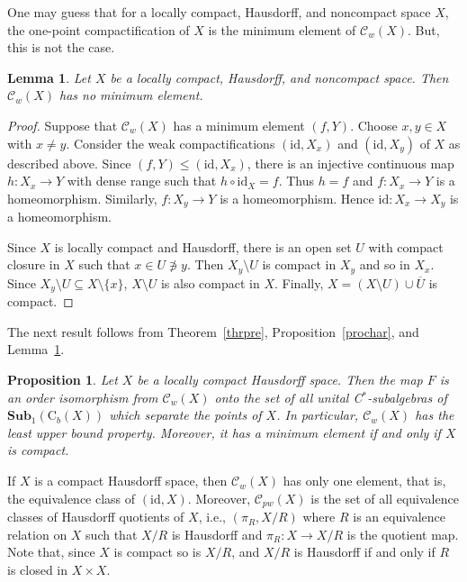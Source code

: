 \documentclass[manuscript]{amsart}
\newtheorem{lemma}[theorem]{Lemma}
\newtheorem{proposition}[theorem]{Proposition}
\theoremstyle{definition}
\begin{document}
One may guess that for a locally compact, Hausdorff, and noncompact space $X$,
the one-point compactification of $X$ is the minimum element of
$\mathcal{C}_{w}(X)$. But, this is not the case.

\begin{lemma}\label{lemnomin}
Let $X$ be a locally compact, Hausdorff, and noncompact space.
Then $\mathcal{C}_{w}(X)$ has no minimum element.
\end{lemma}
\begin{proof}
Suppose that $\mathcal{C}_{w}(X)$ has a minimum  element
$(f,Y)$.
Choose $x,y\in X$ with $x\neq y$. Consider
the weak compactifications $(\mathrm{id}, X_{x})$ and
$(\mathrm{id}, X_{y})$ of $X$ as described above.
Since $(f,Y)\leq (\mathrm{id}, X_{x})$, there is an injective continuous map
$h:X_{x}\to Y$
with dense range
 such that $h\circ \mathrm{id}_{X}=f$. Thus $h=f$ and
$f:X_{x}\to Y$ is a homeomorphism. Similarly, $f:X_{y}\to Y$ is  a homeomorphism.
Hence $\mathrm{id}:X_{x}\to X_{y}$ is a homeomorphism.

Since $X$ is locally compact and Hausdorff, there is an open set $U$
with compact closure  in $X$ such that
$x\in U\not\ni y$. Then $X_{y}\setminus U$ is compact in $X_{y}$
and so in $X_{x}$. Since $X_{y}\setminus U\subseteq X\setminus \{x\}$,
$X\setminus U$ is also compact in $X$. Finally, $X=(X\setminus U) \cup\overline{U}$ is compact.
\end{proof}

The next result follows from Theorem~\ref{thrpre}, Proposition~\ref{prochar},  and
Lemma~\ref{lemnomin}.
\begin{proposition}\label{propweak}
Let $X$ be a locally compact Hausdorff space.
Then the map $F$ is an order isomorphism from
$\mathcal{C}_{w}(X)$ onto the set of all unital C$^*$-subalgebras of
$\mathbf{Sub}_{1}(\mathrm{C}_{b}(X))$  which
separate   the points of $X$.
In particular, $\mathcal{C}_{w}(X)$ has the least upper bound property.
Moreover, it has a minimum element if and only if $X$ is compact.
\end{proposition}

If $X$ is a compact Hausdorff space, then
$\mathcal{C}_{w}(X)$ has only one element, that is, the equivalence class of
$(\mathrm{id},X)$. Moreover, $\mathcal{C}_{pw}(X)$ is
the set of all equivalence classes of Hausdorff quotients of $X$, i.e.,
$(\pi_{R}, {X}/{R})$ where $R$ is an equivalence relation on $X$
such that ${X}/{R}$ is Hausdorff and
$\pi_{R}:X\to {X}/{R}$ is the quotient map. Note that, since   $X$
 is compact so is ${X}/{R}$, and ${X}/{R}$ is Hausdorff
if and only if $R$ is closed in $X\times X$.
\end{document}

